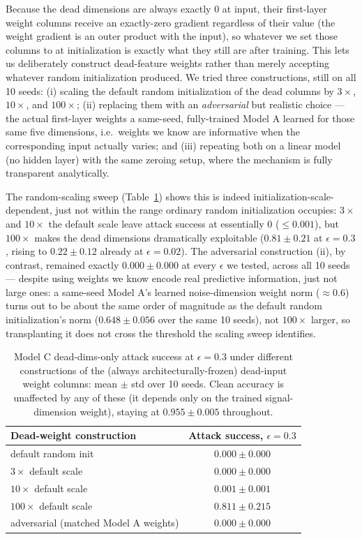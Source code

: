 \documentclass[11pt]{article}
\begin{document}
Because the dead dimensions are always exactly $0$ at input, their
first-layer weight columns receive an exactly-zero gradient regardless of
their value (the weight gradient is an outer product with the input),
so whatever we set those columns to at initialization is exactly what
they still are after training. This lets us deliberately construct
dead-feature weights rather than merely accepting whatever random
initialization produced. We tried three constructions, still on all 10
seeds: (i) scaling the default random initialization of the dead columns
by $3\times$, $10\times$, and $100\times$; (ii) replacing them with an
\emph{adversarial} but realistic choice --- the actual first-layer weights
a same-seed, fully-trained Model A learned for those same five dimensions,
i.e.\ weights we know are informative when the corresponding input
actually varies; and (iii) repeating both on a linear model (no hidden
layer) with the same zeroing setup, where the mechanism is fully
transparent analytically.

The random-scaling sweep (Table~\ref{tab:modelc}) shows this is indeed
initialization-scale-dependent, just not within the range ordinary random
initialization occupies: $3\times$ and $10\times$ the default scale leave
attack success at essentially $0$ ($\le 0.001$), but $100\times$ makes the
dead dimensions dramatically exploitable ($0.81\pm0.21$ at
$\epsilon=0.3$, rising to $0.22\pm0.12$ already at $\epsilon=0.02$). The
adversarial construction (ii), by contrast, remained exactly
$0.000\pm0.000$ at every $\epsilon$ we tested, across all 10 seeds ---
despite using weights we know encode real predictive information, just
not large ones: a same-seed Model A's learned noise-dimension weight norm
($\approx 0.6$) turns out to be about the same order of magnitude as the
default random initialization's norm ($0.648\pm0.056$ over the same 10
seeds), not $100\times$ larger, so transplanting it does not cross the
threshold the scaling sweep identifies.

\begin{table}[h]
\centering
\caption{Model C dead-dims-only attack success at $\epsilon=0.3$ under
different constructions of the (always architecturally-frozen) dead-input
weight columns: mean $\pm$ std over 10 seeds. Clean accuracy is unaffected
by any of these (it depends only on the trained signal-dimension weight),
staying at $0.955\pm0.005$ throughout.}
\label{tab:modelc}
\begin{tabular}{lc}
\toprule
Dead-weight construction & Attack success, $\epsilon=0.3$ \\
\midrule
default random init & $0.000\pm0.000$ \\
$3\times$ default scale & $0.000\pm0.000$ \\
$10\times$ default scale & $0.001\pm0.001$ \\
$100\times$ default scale & $0.811\pm0.215$ \\
adversarial (matched Model A weights) & $0.000\pm0.000$ \\
\bottomrule
\end{tabular}
\end{table}
\end{document}

